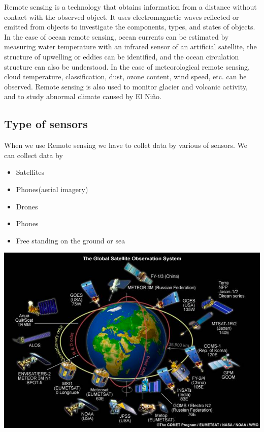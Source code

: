 \documentclass[
  letterpaper,
  DIV=11,
  numbers=noendperiod]{scrreprt}
\begin{document}
Remote sensing is a technology that obtains information from a distance
without contact with the observed object. It uses electromagnetic waves
reflected or emitted from objects to investigate the components, types,
and states of objects. In the case of ocean remote sensing, ocean
currents can be estimated by measuring water temperature with an
infrared sensor of an artificial satellite, the structure of upwelling
or eddies can be identified, and the ocean circulation structure can
also be understood. In the case of meteorological remote sensing, cloud
temperature, classification, dust, ozone content, wind speed, etc. can
be observed. Remote sensing is also used to monitor glacier and volcanic
activity, and to study abnormal climate caused by El Niño.

\hypertarget{type-of-sensors}{%
\subsection{Type of sensors}\label{type-of-sensors}}

When we use Remote sensing we have to collet data by various of sensors.
We can collect data by

\begin{itemize}
\item
  Satellites
\item
  Phones(aerial imagery)
\item
  Drones
\item
  Phones
\item
  Free standing on the ground or sea
\end{itemize}

\includegraphics{./images/paste-070EE831.png}
\end{document}
